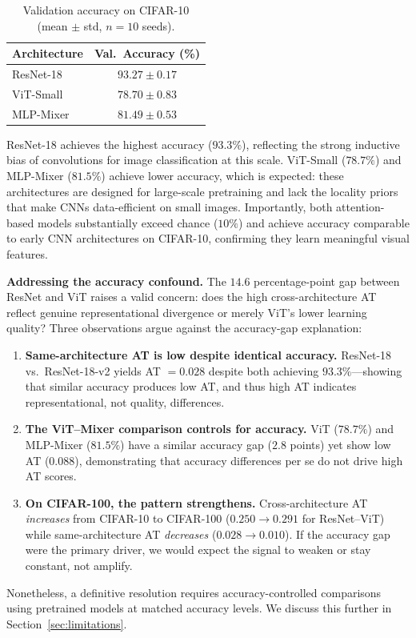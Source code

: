 \documentclass{article}
\begin{document}
\begin{table}[t]
\caption{Validation accuracy on CIFAR-10 (mean $\pm$ std, $n{=}10$ seeds).}
\label{tab:accuracy}
\centering
\small
\begin{tabular}{@{}lc@{}}
\toprule
Architecture & Val.\ Accuracy (\%) \\
\midrule
ResNet-18      & $93.27 \pm 0.17$ \\
ViT-Small      & $78.70 \pm 0.83$ \\
MLP-Mixer      & $81.49 \pm 0.53$ \\
\bottomrule
\end{tabular}
\end{table}

ResNet-18 achieves the highest accuracy ($93.3\%$), reflecting the strong inductive bias of convolutions for image classification at this scale. ViT-Small ($78.7\%$) and MLP-Mixer ($81.5\%$) achieve lower accuracy, which is expected: these architectures are designed for large-scale pretraining and lack the locality priors that make CNNs data-efficient on small images. Importantly, both attention-based models substantially exceed chance ($10\%$) and achieve accuracy comparable to early CNN architectures on CIFAR-10, confirming they learn meaningful visual features.

\textbf{Addressing the accuracy confound.} The $14.6$ percentage-point gap between ResNet and ViT raises a valid concern: does the high cross-architecture AT reflect genuine representational divergence or merely ViT's lower learning quality? Three observations argue against the accuracy-gap explanation:
\begin{enumerate}
    \item \textbf{Same-architecture AT is low despite identical accuracy.} ResNet-18 vs.\ ResNet-18-v2 yields AT $= 0.028$ despite both achieving $93.3\%$---showing that similar accuracy produces low AT, and thus high AT indicates representational, not quality, differences.
    \item \textbf{The ViT--Mixer comparison controls for accuracy.} ViT ($78.7\%$) and MLP-Mixer ($81.5\%$) have a similar accuracy gap ($2.8$ points) yet show low AT ($0.088$), demonstrating that accuracy differences per se do not drive high AT scores.
    \item \textbf{On CIFAR-100, the pattern strengthens.} Cross-architecture AT \emph{increases} from CIFAR-10 to CIFAR-100 ($0.250 \to 0.291$ for ResNet--ViT) while same-architecture AT \emph{decreases} ($0.028 \to 0.010$). If the accuracy gap were the primary driver, we would expect the signal to weaken or stay constant, not amplify.
\end{enumerate}
Nonetheless, a definitive resolution requires accuracy-controlled comparisons using pretrained models at matched accuracy levels. We discuss this further in Section~\ref{sec:limitations}.
\end{document}
